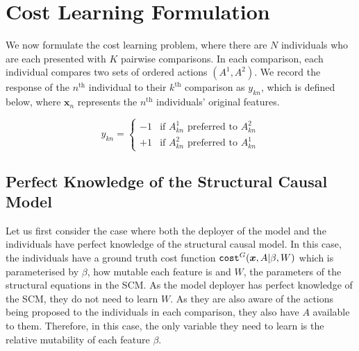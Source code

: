 \section{Cost Learning Formulation}

We now formulate the cost learning problem, where there are $N$ individuals who are each presented with $K$ pairwise comparisons. In each comparison, each individual compares two sets of ordered actions $(A^1, A^2)$. We record the response of the $n^{\text{th}}$ individual to their $k^{\text{th}}$ comparison as $y_{kn}$, which is defined below, where $\boldsymbol{x}_n$ represents the $n^{\text{th}}$ individuals' original features.



\begin{equation} \label{eq:paired_response}
	y_{kn} = \begin{cases}
		-1 & \text{if } A^1_{kn} \text{ preferred to } A^2_{kn} \\
		+1 & \text{if } A^2_{kn} \text{ preferred to } A^1_{kn}
	\end{cases}
\end{equation}



\subsection{Perfect Knowledge of the Structural Causal Model}

Let us first consider the case where both the deployer of the model and the individuals have perfect knowledge of the structural causal model. In this case, the individuals have a ground truth cost function $\operatorname*{\texttt{cost}}^G(\boldsymbol{x}, A|\beta, W)$ which is parameterised by $\beta$, how mutable each feature is and $W$, the parameters of the structural equations in the SCM. As the model deployer has perfect knowledge of the SCM, they do not need to learn $W$. As they are also aware of the actions being proposed to the individuals in each comparison, they also have $A$ available to them. Therefore, in this case, the only variable they need to learn is the relative mutability of each feature $\beta$.\\

